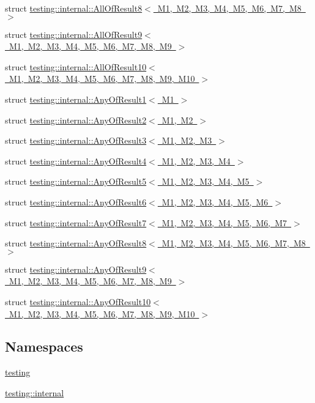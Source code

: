 \begin{DoxyCompactItemize}
\item 
struct \mbox{\hyperlink{structtesting_1_1internal_1_1_all_of_result8}{testing\+::internal\+::\+All\+Of\+Result8$<$ M1, M2, M3, M4, M5, M6, M7, M8 $>$}}
\item 
struct \mbox{\hyperlink{structtesting_1_1internal_1_1_all_of_result9}{testing\+::internal\+::\+All\+Of\+Result9$<$ M1, M2, M3, M4, M5, M6, M7, M8, M9 $>$}}
\item 
struct \mbox{\hyperlink{structtesting_1_1internal_1_1_all_of_result10}{testing\+::internal\+::\+All\+Of\+Result10$<$ M1, M2, M3, M4, M5, M6, M7, M8, M9, M10 $>$}}
\item 
struct \mbox{\hyperlink{structtesting_1_1internal_1_1_any_of_result1}{testing\+::internal\+::\+Any\+Of\+Result1$<$ M1 $>$}}
\item 
struct \mbox{\hyperlink{structtesting_1_1internal_1_1_any_of_result2}{testing\+::internal\+::\+Any\+Of\+Result2$<$ M1, M2 $>$}}
\item 
struct \mbox{\hyperlink{structtesting_1_1internal_1_1_any_of_result3}{testing\+::internal\+::\+Any\+Of\+Result3$<$ M1, M2, M3 $>$}}
\item 
struct \mbox{\hyperlink{structtesting_1_1internal_1_1_any_of_result4}{testing\+::internal\+::\+Any\+Of\+Result4$<$ M1, M2, M3, M4 $>$}}
\item 
struct \mbox{\hyperlink{structtesting_1_1internal_1_1_any_of_result5}{testing\+::internal\+::\+Any\+Of\+Result5$<$ M1, M2, M3, M4, M5 $>$}}
\item 
struct \mbox{\hyperlink{structtesting_1_1internal_1_1_any_of_result6}{testing\+::internal\+::\+Any\+Of\+Result6$<$ M1, M2, M3, M4, M5, M6 $>$}}
\item 
struct \mbox{\hyperlink{structtesting_1_1internal_1_1_any_of_result7}{testing\+::internal\+::\+Any\+Of\+Result7$<$ M1, M2, M3, M4, M5, M6, M7 $>$}}
\item 
struct \mbox{\hyperlink{structtesting_1_1internal_1_1_any_of_result8}{testing\+::internal\+::\+Any\+Of\+Result8$<$ M1, M2, M3, M4, M5, M6, M7, M8 $>$}}
\item 
struct \mbox{\hyperlink{structtesting_1_1internal_1_1_any_of_result9}{testing\+::internal\+::\+Any\+Of\+Result9$<$ M1, M2, M3, M4, M5, M6, M7, M8, M9 $>$}}
\item 
struct \mbox{\hyperlink{structtesting_1_1internal_1_1_any_of_result10}{testing\+::internal\+::\+Any\+Of\+Result10$<$ M1, M2, M3, M4, M5, M6, M7, M8, M9, M10 $>$}}
\end{DoxyCompactItemize}
\subsection*{Namespaces}
\begin{DoxyCompactItemize}
\item 
 \mbox{\hyperlink{namespacetesting}{testing}}
\item 
 \mbox{\hyperlink{namespacetesting_1_1internal}{testing\+::internal}}
\end{DoxyCompactItemize}
